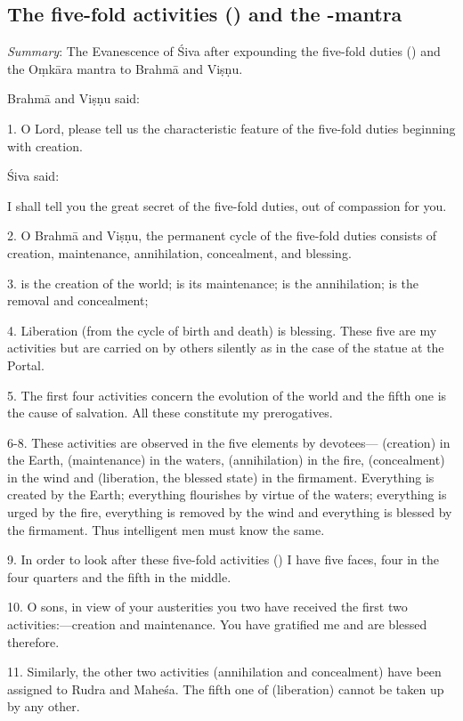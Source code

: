 \subsection{The five-fold activities () and the -mantra}

\emph{Summary}: The Evanescence of Śiva after expounding the five-fold duties
() and the Oṃkāra mantra to Brahmā and Viṣṇu.

Brahmā and Viṣṇu said:

1. O Lord, please tell us the characteristic feature of the five-fold duties
beginning with creation.

Śiva said:

I shall tell you the great secret of the five-fold duties, out of compassion
for you.

2. O Brahmā and Viṣṇu, the permanent cycle of the five-fold duties consists of
creation, maintenance, annihilation, concealment, and blessing.

3.  is the creation of the world;  is its maintenance;
 is the annihilation;  is the removal and concealment;

4. Liberation (from the cycle of birth and death) is blessing. These five are my
activities but are carried on by others silently as in the case of the statue
at the Portal.

5. The first four activities concern the evolution of the world and the fifth
one is the cause of salvation. All these constitute my prerogatives.

6-8. These activities are observed in the five elements by devotees—
(creation) in the Earth,  (maintenance) in the waters, 
(annihilation) in the fire,  (concealment) in the wind and
 (liberation, the blessed state) in the firmament. Everything is
created by the Earth; everything flourishes by virtue of the waters; everything
is urged by the fire, everything is removed by the wind and everything is
blessed by the firmament. Thus intelligent men must know the same.

9. In order to look after these five-fold activities () I have
five faces, four in the four quarters and the fifth in the middle.

10. O sons, in view of your austerities you two have received the first two
activities:—creation and maintenance. You have gratified me and are blessed
therefore.

11. Similarly, the other two activities (annihilation and concealment) have been
assigned to Rudra and Maheśa. The fifth one of  (liberation) cannot
be taken up by any other.

